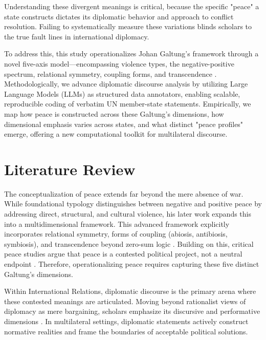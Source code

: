 \documentclass[sigconf,review,anonymous,balance=false]{acmart}
\begin{document}
Understanding these divergent meanings is critical, because the specific "peace" a state constructs dictates its diplomatic behavior and approach to conflict resolution. Failing to systematically measure these variations blinds scholars to the true fault lines in international diplomacy.

To address this, this study operationalizes Johan Galtung’s framework through a novel five-axis model—encompassing violence types, the negative-positive spectrum, relational symmetry, coupling forms, and transcendence \cite{galtung1969violence,galtung2012peace}. Methodologically, we advance diplomatic discourse analysis by utilizing Large Language Models (LLMs) as structured data annotators, enabling scalable, reproducible coding of verbatim UN member-state statements. Empirically, we map how peace is constructed across these Galtung's dimensions, how dimensional emphasis varies across states, and what distinct "peace profiles" emerge, offering a new computational toolkit for multilateral discourse.

\section{Literature Review}
The conceptualization of peace extends far beyond the mere absence of war. While \cite{galtung1969violence} foundational typology distinguishes between negative and positive peace by addressing direct, structural, and cultural violence, his later work expands this into a multidimensional framework. This advanced framework explicitly incorporates relational symmetry, forms of coupling (abiosis, antibiosis, symbiosis), and transcendence beyond zero-sum logic \cite{galtung2012peace}. Building on this, critical peace studies argue that peace is a contested political project, not a neutral endpoint \cite{richmond2005transformation}. Therefore, operationalizing peace requires capturing these five distinct Galtung's dimensions.

Within International Relations, diplomatic discourse is the primary arena where these contested meanings are articulated. Moving beyond rationalist views of diplomacy as mere bargaining, scholars emphasize its discursive and performative dimensions \cite{neumann2002returning,sending2015diplomacy}. In multilateral settings, diplomatic statements actively construct normative realities and frame the boundaries of acceptable political solutions.
\end{document}
